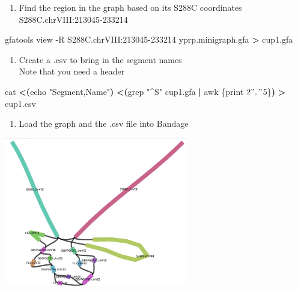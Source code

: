 \documentclass[
]{book}
\newenvironment{Shaded}{\begin{snugshade}}{\end{snugshade}}
\newcommand{\AttributeTok}[1]{\textcolor[rgb]{0.77,0.63,0.00}{#1}}
\newcommand{\BuiltInTok}[1]{#1}
\newcommand{\ExtensionTok}[1]{#1}
\newcommand{\FunctionTok}[1]{\textcolor[rgb]{0.00,0.00,0.00}{#1}}
\newcommand{\KeywordTok}[1]{\textcolor[rgb]{0.13,0.29,0.53}{\textbf{#1}}}
\newcommand{\NormalTok}[1]{#1}
\newcommand{\OperatorTok}[1]{\textcolor[rgb]{0.81,0.36,0.00}{\textbf{#1}}}
\newcommand{\StringTok}[1]{\textcolor[rgb]{0.31,0.60,0.02}{#1}}
\providecommand{\tightlist}{%
  \setlength{\itemsep}{0pt}\setlength{\parskip}{0pt}}
\begin{document}
\begin{enumerate}
\def\labelenumi{\arabic{enumi}.}
\tightlist
\item
  Find the region in the graph based on its S288C coordinates\\
  S288C.chrVIII:213045-233214
\end{enumerate}

\begin{Shaded}
\begin{Highlighting}[]
\ExtensionTok{gfatools}\NormalTok{ view }\AttributeTok{{-}R}\NormalTok{ S288C.chrVIII:213045{-}233214 yprp.minigraph.gfa }\OperatorTok{\textgreater{}}\NormalTok{ cup1.gfa}
\end{Highlighting}
\end{Shaded}

\begin{enumerate}
\def\labelenumi{\arabic{enumi}.}
\setcounter{enumi}{1}
\tightlist
\item
  Create a .csv to bring in the segment names\\
  Note that you need a header
\end{enumerate}

\begin{Shaded}
\begin{Highlighting}[]
 \FunctionTok{cat} \OperatorTok{\textless{}(}\BuiltInTok{echo} \StringTok{"Segment,Name"}\OperatorTok{)} \OperatorTok{\textless{}(}\FunctionTok{grep} \StringTok{"\^{}S"}\NormalTok{ cup1.gfa }\KeywordTok{|} \FunctionTok{awk} \StringTok{\textquotesingle{}\{print $2 "," $5\}\textquotesingle{}}\OperatorTok{)} \OperatorTok{\textgreater{}}\NormalTok{ cup1.csv}
\end{Highlighting}
\end{Shaded}

\begin{enumerate}
\def\labelenumi{\arabic{enumi}.}
\setcounter{enumi}{2}
\tightlist
\item
  Load the graph and the .csv file into Bandage
\end{enumerate}

\includegraphics[width=0.6\textwidth,height=\textheight]{./Figures/Bandage3.png}
\end{document}
